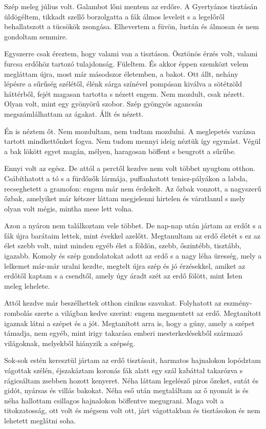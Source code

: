 \documentclass{IEEEtran}
\begin{document}
Szép meleg július volt. Galambot lőni mentem az erdőre. A Gyertyános tisztásán üldögéltem, tikkadt szellő borzolgatta a fák álmos leveleit s a legelőről behallatszott a tücsökök zsongása. Elhevertem a füvön, lustán és álmosan és nem gondoltam semmire.

Egyszerre csak éreztem, hogy valami van a tisztáson. Ösztönös érzés volt, valami furcsa erdőhöz tartozó tulajdonság. Füleltem. És akkor éppen szemközt velem megláttam újra, most már másodszor életemben, a bakot. Ott állt, nehány lépésre a sűrűség szélétől, élénk sárga színével pompásan kiválva a sötétzöld háttérből, fejét magasan tartotta s nézett engem. Nem mozdult, csak nézett. Olyan volt, mint egy gyönyörű szobor. Szép gyöngyös agancsán megszámlálhattam az ágakat. Állt és nézett.

Én is néztem őt. Nem mozdultam, nem tudtam mozdulni. A meglepetés varázsa tartott mindkettőnket fogva. Nem tudom mennyi ideig néztük így egymást. Végül a bak lökött egyet magán, mélyen, haragosan böffent s beugrott a sűrűbe.

Ennyi volt az egész. De attól a perctől kezdve nem volt többet nyugtom otthon. Csábíthatott a tó s a fürdőzők lármája, puffanhatott tenisz-pályákon a labda, recseghetett a gramofon: engem már nem érdekelt. Az őzbak vonzott, a nagyszerű őzbak, amelyiket már kétszer láttam megjelenni hirtelen és váratlanul s mely olyan volt mégis, mintha mese lett volna.

Azon a nyáron nem találkoztam vele többet. De nap-nap után jártam az erdőt s a fák újra barátaim lettek, mint évekkel azelőtt. Megtanultam az erdő életét s ez az élet szebb volt, mint minden egyéb élet a földön, szebb, őszintébb, tisztább, igazabb. Komoly és szép gondolatokat adott az erdő s a nagy léha üresség, mely a lelkemet már-már uralni kezdte, megtelt újra szép és jó érzésekkel, amiket az erdőtől kaptam s a csendtől, amely úgy áradt szét az erdő fölött, mint Isten meleg lehelete.

Attól kezdve már beszélhettek otthon cinikus szavakat. Folyhatott az eszmény-rombolás szerte a világban kedve szerint: engem megmentett az erdő. Megtanított igaznak látni a szépet és a jót. Megtanított arra is, hogy a gúny, amely a szépet támadja, nem egyéb, mint irigy takarása emberi mesterkedésekből származó világoknak, melyekből hiányzik a szépség.

Sok-sok estén keresztül jártam az erdő tisztásait, harmatos hajnalokon lopództam vágottak szélén, éjszakáztam koronás fák alatt egy szál kabáttal takarózva s rágicsáltam zsebben hozott kenyeret. Néha láttam legelésző piros őzeket, sutát és gidót, nyársas és villás bakokat. Néha eső után megtaláltam az ő nyomát is és néha hallottam csillagos hajnalokon böffentve megugrani. Maga volt a titokzatosság, ott volt és mégsem volt ott, járt vágottakban és tisztásokon és nem lehetett meglátni soha.
\end{document}
